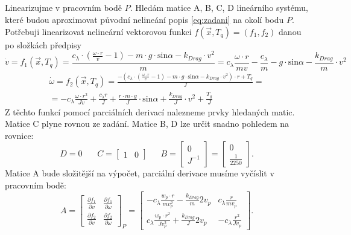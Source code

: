 \documentclass[twoside]{article}
\begin{document}
\subsection{}
Linearizujme v pracovním bodě $P$. Hledám matice A, B, C, D lineárního systému, které budou aproximovat původní nelineání popis \eqref{eq:zadani} na okolí bodu $P$.
Potřebuji linearizovat nelineární vektorovou funkci $f(\vec{x}, T_q) = (f_1, f_2)$ danou po složkách předpisy
\begin{equation}
		\dot{v} = f_1(\vec{x}, T_q) = \frac{c_\lambda \cdot \left(\frac{\omega \cdot r}{v} - 1 \right) - m \cdot g \cdot \text{sin} \alpha - k_{Drag} \cdot v^2}{m}
		= c_\lambda \frac{\omega \cdot r}{mv} - \frac{c_\lambda}{m} - g \cdot \text{sin} \alpha - \frac{k_{Drag}}{m} \cdot v^2
	\end{equation}
	\begin{equation}
		\begin{split}
			\dot{\omega} = f_2(\vec{x}, T_q) = \frac{-(c_\lambda \cdot \left(\frac{\omega \cdot r}{v} - 1 \right) - m \cdot g \cdot \text{sin} \alpha - k_{Drag} \cdot v^2) \cdot r + T_q}{J} = \\
			= -c_\lambda \frac{\omega \cdot r^2}{Jv} + \frac{c_\lambda r}{J}  + \frac{r \cdot m \cdot g}{J} \cdot \text{sin} \alpha + \frac{k_{Drag}}{J} \cdot v^2 + \frac{T_q}{J}
		\end{split}
	\end{equation}
Z těchto funkcí pomocí parciálních derivací nalezneme prvky hledaných matic. Matice C plyne rovnou ze zadání. Matice B, D lze určit snadno pohledem na rovnice:
\begin{equation}
	D = 0 ~~~~~~~~ C = \begin{bmatrix}
		1 & 0
	\end{bmatrix} ~~~~~~~ B = \begin{bmatrix}
		0 \\ J^{-1}
	\end{bmatrix} = \begin{bmatrix}
		0 \\ \frac{1}{2250}
	\end{bmatrix}.
\end{equation}
Matice A bude složitější na výpočet, parciální derivace musíme vyčíslit v pracovním bodě: 
\begin{equation}
	A = \begin{bmatrix}
		\frac{\partial f_1}{\partial v} & \frac{\partial f_1}{\partial \omega} \\ 
		\frac{\partial f_2}{\partial v} & \frac{\partial f_2}{\partial \omega}
	\end{bmatrix}_P = \begin{bmatrix}
		-c_\lambda \frac{w_p \cdot r}{m v_p^2} - \frac{k_{Drag}}{m}2v_p & c_\lambda \frac{r}{m v_p} \\
		c_\lambda \frac{w_p \cdot r^2}{J v_p^2} + \frac{k_{Drag}}{J}2v_p & -c_\lambda \frac{r^2}{J v_p}
	\end{bmatrix}.
\end{equation}
\end{document}
